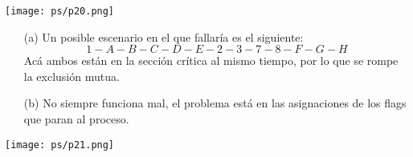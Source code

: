 \documentclass[openany]{book}
\begin{document}
\texttt{[image: ps/p20.png]}

\begin{rta}
    \begin{itemize}
        \item[(a)] Un posible escenario en el que fallaría es el siguiente:
        \begin{equation*}
            1-A-B-C-D-E-2-3-7-8-F-G-H
        \end{equation*}
        Acá ambos están en la sección crítica al mismo tiempo, por lo que se rompe la exclusión mutua.
        \item[(b)] No siempre funciona mal, el problema está en las asignaciones de los flags que paran al proceso. 
    \end{itemize}
\end{rta}

\texttt{[image: ps/p21.png]}
\end{document}
